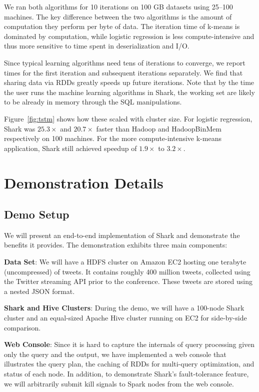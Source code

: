 \documentclass[preprint]{acm_proc_article-sp}
\newcommand{\HadoopBM}{HadoopBinMem\xspace}
\begin{document}
We ran both algorithms for 10 iterations on 100 GB datasets using 25--100 machines. The key difference between the two algorithms is the amount of computation they perform per byte of data. The
iteration time of k-means is dominated by computation, while
logistic regression is less compute-intensive and thus more sensitive
to time spent in deserialization and I/O.

Since typical learning algorithms need tens of iterations to converge,
we report times for the first iteration and subsequent iterations separately.
We find that sharing data via RDDs greatly speeds up future iterations. Note that by the time the user runs the machine learning algorithms in Shark, the working set are likely to be already in memory through the SQL manipulations.

Figure~\ref{fig:tstm} shows how these scaled with cluster size. For logistic regression, Shark was $25.3\times$ and $20.7\times$ faster than Hadoop and \HadoopBM respectively on 100 machines. For the more compute-intensive k-means application, Shark still achieved speedup of $1.9\times$ to $3.2\times$.


\section{Demonstration Details}
\subsection{Demo Setup}
We will present an end-to-end implementation of Shark and demonstrate the benefits it provides. The demonstration exhibits three main components:

\textbf{Data Set}: We will have a HDFS cluster on Amazon EC2 hosting one terabyte (uncompressed) of tweets. It contains roughly 400 million tweets, collected using the Twitter streaming API prior to the conference. These tweets are stored using a nested JSON format.

\textbf{Shark and Hive Clusters}: During the demo, we will have a 100-node Shark cluster and an equal-sized Apache Hive cluster running on EC2 for side-by-side comparison.

\textbf{Web Console}: Since it is hard to capture the internals of query processing given only the query and the output, we have implemented a web console that illustrates the query plan, the caching of RDDs for multi-query optimization, and status of each node. In addition, to demonstrate Shark's fault-tolerance feature, we will arbitrarily submit kill signals to Spark nodes from the web console.
\end{document}
